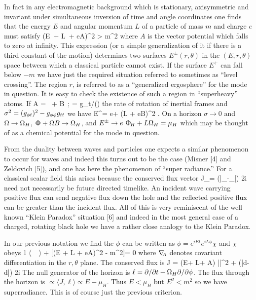 In fact in any electromagnetic background which is stationary, axisymmetric and
invariant under simultaneous inversion of time and angle coordinates one finds that the
energy $E$ and angular momentum $L$ of a particle of mass $m$ and charge $e$ must satisfy
\be
(E\, \dt + L\, \dphi + eA)^2 > m^2
\ee
where $A$ is the vector potential which falls to zero at infinity.
This expression (or a simple generalization of it if there is a third constant of the motion)
determines two surfaces $E^{\pm} (r,\theta)$ in the $(E, r, \theta)$ space between which
a classical particle cannot exist. If the surface $E^+$ can fall below $- m$ we have just the
required situation referred to sometimes as ``level crossing''. The region $r$,
is referred to as a ``generalized ergosphere'' for the mode in question.
It is easy to check the existence of such a region in ``superheavy'' atoms. If
\be
A = \Phi\, \dt + B\, \dphi; \quad \Omega = g_{\phi t}/(\gtt)
\ee
the rate of rotation of inertial frames and $\sigma^2 = (g_{\phi t})^2 - g_{\phi\phi}g_{tt}$ we have
\be
E^\pm = e\mathop\Phi + (L + eB)\Omega \pm \sigma^2  .
\ee
\ni
On a horizon $\sigma\rightarrow 0$ and $\Omega \rightarrow \Omega_H$, $\Upphi + \Omega B \rightarrow \Omega_H$, and
$E^\pm \rightarrow e \mathop{}\Upphi_{\!H} + L \Omega_H = \mu_H$
which may be thought of as a chemical potential for the mode in question.

From the duality between waves and particles one expects a similar
phenomenon to occur for waves and indeed this turns out to be the case
(Misner [4] and Zeldovich [5]), and one has here the phenomenon of
``super radiance.'' For a classical scalar ﬁeld this arises because
the conserved flux vector
\be
J_\mu = {(\bar\phi\grad_{\!\mu}\phi-\phi\grad_{\!\mu}\bar\phi) \over 2i}
\ee
need not necessarily be future directed timelike. An incident wave carrying positive flux can send negative flux down the hole and the reflected positive flux can be greater than the incident flux. All of this is very reminiscent of the well known ``Klein Paradox'' situation [6] and indeed in the most general case of a charged, rotating black hole we have a rather close analogy to the Klein Paradox. 

In our previous notation we find the $\phi$ can be written as $\phi = e^{iEt}e^{iL\phi}\chi$ and $\chi$ obeys
\be
{1 \over \sigma}(\gradsubA \, \sigma \, \gradsupA \chi) + {[(E \dt + L \dphi + eA)^2 - m^2]}\chi = 0
\ee
where $\gradsubA$ denotes covariant differentiation in the $r, \theta$ plane. The conserved flux is
\be
J = (E\dt + L\dphi + A) |\chi|^2 + {(\bar\chi d\chi - \chi d\bar\chi) \over 2i}
\ee
The null generator of the horizon is $\ell = \partial / \partial t - \Omega_H \partial/\partial\phi$.
The flux through the horizon is $\propto \langle J, \ell \rangle \propto E - \mu_H$. Thus $E < \mu_H$
but $E^2 < m^2$ so we have superradiance. This is of course just the previous criterion.

